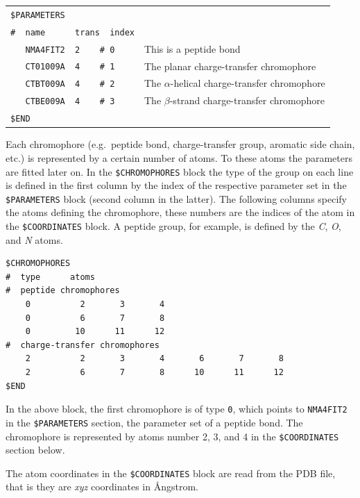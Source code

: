 \documentclass[11pt, letterpaper]{article}
\begin{document}
{\small
\begin{tabular}{p{5cm}p{9cm}}
\verb'$PARAMETERS'               &                                                    \\
\verb'#  name      trans  index' &                                                    \\
\verb'   NMA4FIT2  2    # 0'     & This is a peptide bond                             \\
\verb'   CT01009A  4    # 1'     & The planar charge-transfer chromophore             \\
\verb'   CTBT009A  4    # 2'     & The $\alpha$-helical charge-transfer chromophore   \\
\verb'   CTBE009A  4    # 3'     & The $\beta$-strand charge-transfer chromophore     \\
\verb'$END'                      &                                                    \\
\end{tabular}
}

Each chromophore (e.g.\ peptide bond, charge-transfer group, aromatic side chain, etc.) is represented by a certain number of atoms. To these atoms the parameters are fitted later on. In the \verb'$CHROMOPHORES' block the type of the group on each line is defined in the first column by the index of the respective parameter set in the \verb'$PARAMETERS' block (second column in the latter). The following columns specify the atoms defining the chromophore, these numbers are the indices of the atom in the \verb'$COORDINATES' block. A peptide group, for example, is defined by the \emph{C}, \emph{O}, and \emph{N} atoms.

{\small
\begin{verbatim}
$CHROMOPHORES
#  type      atoms
#  peptide chromophores
    0          2       3       4
    0          6       7       8
    0         10      11      12
#  charge-transfer chromophores
    2          2       3       4       6       7       8
    2          6       7       8      10      11      12
$END                             
\end{verbatim}
}

In the above block, the first chromophore is of type \verb'0', which points to \verb'NMA4FIT2'\cite{Besley:99:9636} in the \verb'$PARAMETERS' section, the parameter set of a peptide bond. The chromophore is represented by atoms number 2, 3, and 4 in the \verb'$COORDINATES' section below. 

The atom coordinates in the \verb'$COORDINATES' block are read from the PDB file, that is they are \emph{xyz} coordinates in \AA ngstrom.
\end{document}
